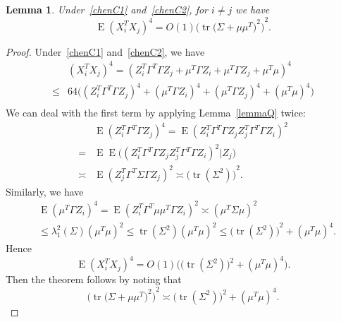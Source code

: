 \documentclass[review]{elsarticle}
\DeclareMathOperator{\mytr}{tr}
\DeclareMathOperator{\myE}{E}
\theoremstyle{plain}
\newtheorem{lemma}{Lemma}
\theoremstyle{definition}
\theoremstyle{remark}
\begin{document}
\begin{lemma}\label{smallLemma1}
    Under~\eqref{chenC1} and~\eqref{chenC2}, for $i\neq j$ we have
    \begin{equation}\label{eq:20170220}
        \myE{(X_i^T X_j)}^4=%
             O(1){\Big(\mytr {\big(\Sigma+\mu\mu^T\big)}^2\Big)}^2.
    \end{equation}
\end{lemma}
\begin{proof}

    Under~\eqref{chenC1} and~\eqref{chenC2}, we have
        \begin{equation*}
        \begin{aligned}
            &{(X_i^T X_j)}^4=
            {(Z_i^T \Gamma^T \Gamma Z_j+\mu^T \Gamma Z_i+\mu^T \Gamma Z_j+\mu^T \mu)}^4\\
            \leq &
            64\big((Z_i^T \Gamma^T \Gamma Z_j)^4+(\mu^T \Gamma Z_i)^4+(\mu^T \Gamma Z_j)^4+(\mu^T \mu)^4\big)\\
        \end{aligned}
        \end{equation*}
    We can deal with the first term by applying Lemma~\ref{lemmaQ} twice:
        \begin{equation*}
        \begin{aligned}
            &\myE(Z_i^T \Gamma^T \Gamma Z_j)^4=
        \myE(Z_i^T \Gamma^T \Gamma Z_j Z_j^T \Gamma^T \Gamma Z_i)^2\\
            =&
            \myE\myE\big((Z_i^T \Gamma^T \Gamma Z_j Z_j^T \Gamma^T \Gamma Z_i)^2 | Z_j\big)\\
            \asymp &  \myE{(Z_j^T \Gamma^T \Sigma \Gamma Z_j)}^2
            \asymp   {\big(\mytr (\Sigma^2)\big)}^2.%
        \end{aligned}
        \end{equation*}
    Similarly, we have
        \begin{equation*}
        \begin{aligned}
            &\myE(\mu^T \Gamma Z_i)^4=
        \myE(Z_i^T \Gamma^T \mu\mu^T \Gamma Z_i)^2
            \asymp  {(\mu^T \Sigma \mu)}^2\\
            &\leq \lambda_{1}^2(\Sigma){(\mu^T \mu)}^2
        \leq \mytr (\Sigma^2){(\mu^T \mu)}^2
            \leq {\big(\mytr (\Sigma^2)\big)}^2+{(\mu^T \mu)}^4.
        \end{aligned}
        \end{equation*}
Hence
    \begin{equation*}
    \myE (X_i^T X_j)^4=O(1)\Big(\big(\mytr(\Sigma^2)\big)^2+(\mu^T \mu)^4\Big).
    \end{equation*}
Then the theorem follows by noting that
    \begin{equation*}
{\Big(\mytr {\big(\Sigma+\mu\mu^T\big)}^2\Big)}^2
\asymp
    \big(\mytr(\Sigma^2)\big)^2+(\mu^T \mu)^4.
    \end{equation*}
\end{proof}
\end{document}
